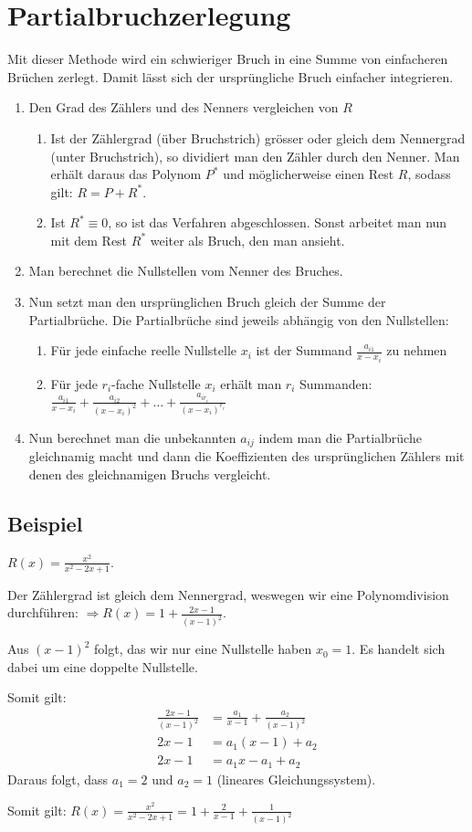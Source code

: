 \section{Partialbruchzerlegung}
Mit dieser Methode wird ein schwieriger Bruch in eine Summe von einfacheren
Brüchen zerlegt. Damit lässt sich der ursprüngliche Bruch einfacher integrieren.

\begin{enumerate}
	\item Den Grad des Zählers und des Nenners vergleichen von $R$
	\begin{enumerate}
		\item Ist der Zählergrad (über Bruchstrich) grösser oder gleich dem Nennergrad
		(unter Bruchstrich), so dividiert man den Zähler durch den Nenner. Man erhält
		daraus das Polynom $P^*$ und möglicherweise einen Rest $R$, sodass gilt: $R =
		P + R^*$.
		\item Ist $R^* \equiv 0$, so ist das Verfahren abgeschlossen. Sonst arbeitet
		man nun mit dem Rest $R^*$ weiter als Bruch, den man ansieht.
	\end{enumerate}
	\item Man berechnet die Nullstellen vom Nenner des Bruches.
	\item Nun setzt man den ursprünglichen Bruch gleich der Summe der
	Partialbrüche. Die Partialbrüche sind jeweils abhängig von den Nullstellen:
	\begin{enumerate}
		\item Für jede einfache reelle Nullstelle $x_i$ ist der Summand
		$\frac{a_{i1}}{x-x_i}$ zu nehmen
		\item Für jede $r_i$-fache Nullstelle $x_i$ erhält man $r_i$ Summanden:
		$\frac{a_{i1}}{x-x_i} + \frac{a_{i2}}{(x-x_i)^2} + \ldots +
		\frac{a_{ir_i}}{(x-x_i)^{r_i}}$
	\end{enumerate}
	\item Nun berechnet man die unbekannten $a_{ij}$ indem man die Partialbrüche
	gleichnamig macht und dann die Koeffizienten des ursprünglichen Zählers mit
	denen des gleichnamigen Bruchs vergleicht.
\end{enumerate}

\subsection{Beispiel}
$R(x) = \frac{x^2}{x^2-2x+1}$.

Der Zählergrad ist gleich dem Nennergrad,
weswegen wir eine Polynomdivision durchführen: $\Rightarrow R(x) = 1 +
\frac{2x-1}{(x-1)^2}$.

Aus $(x-1)^2$ folgt, das wir nur eine Nullstelle haben $x_0 = 1$. Es handelt
sich dabei um eine doppelte Nullstelle.

Somit gilt:
\begin{align*}
\frac{2x-1}{(x-1)^2} &= \frac{a_1}{x-1} + \frac{a_2}{(x-1)^2}\\
2x-1 &= a_1(x-1) + a_2\\
2x-1 &= a_1 x - a_1 + a_2
\end{align*}
Daraus folgt, dass $a_1 = 2$ und $a_2 = 1$ (lineares Gleichungssystem).

Somit gilt: $R(x) = \frac{x^2}{x^2-2x+1} = 1 + \frac{2}{x-1} +
\frac{1}{(x-1)^2}$
